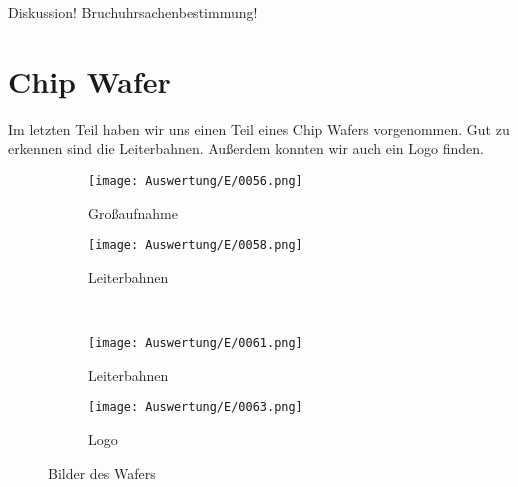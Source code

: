 Diskussion! Bruchuhrsachenbestimmung!

\newpage
\section{Chip Wafer}

Im letzten Teil haben wir uns einen Teil eines Chip Wafers vorgenommen. Gut zu erkennen sind die Leiterbahnen. Außerdem konnten wir auch ein Logo finden.

\begin{figure}[h]
    \centering
    
    \begin{subfigure}[b]{0.45\textwidth}
        \centering
        \texttt{[image: Auswertung/E/0056.png]}
        \caption{Großaufnahme}
    \end{subfigure}
    \hfill
    \begin{subfigure}[b]{0.45\textwidth}
        \centering
        \texttt{[image: Auswertung/E/0058.png]}
        \caption{Leiterbahnen}
    \end{subfigure}
    \\
    \begin{subfigure}[b]{0.45\textwidth}
        \centering
        \texttt{[image: Auswertung/E/0061.png]}
        \caption{Leiterbahnen}
    \end{subfigure}
    \hfill
    \begin{subfigure}[b]{0.45\textwidth}
        \centering
        \texttt{[image: Auswertung/E/0063.png]}
        \caption{Logo}
    \end{subfigure}
    \caption{Bilder des Wafers}
\end{figure}